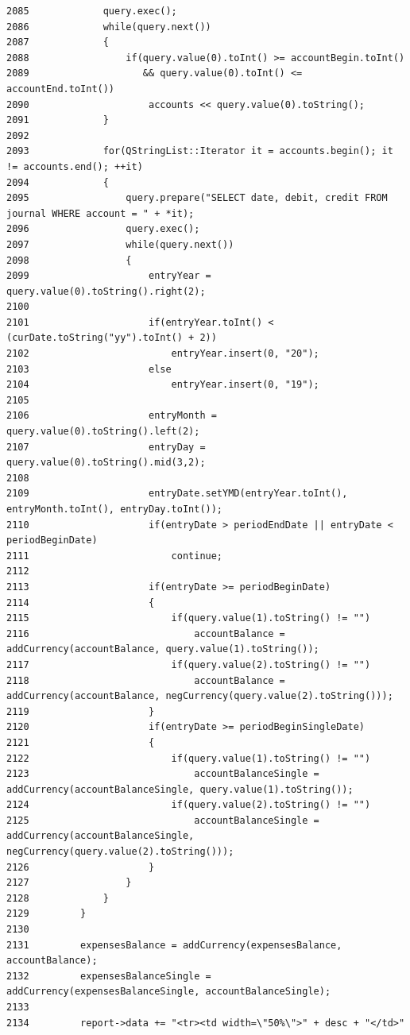 \begin{verbatim}
2085             query.exec();
2086             while(query.next())
2087             {
2088                 if(query.value(0).toInt() >= accountBegin.toInt()
2089                    && query.value(0).toInt() <= accountEnd.toInt())
2090                     accounts << query.value(0).toString();
2091             }
2092 
2093             for(QStringList::Iterator it = accounts.begin(); it != accounts.end(); ++it)
2094             {
2095                 query.prepare("SELECT date, debit, credit FROM journal WHERE account = " + *it);
2096                 query.exec();
2097                 while(query.next())
2098                 {
2099                     entryYear = query.value(0).toString().right(2);
2100 
2101                     if(entryYear.toInt() < (curDate.toString("yy").toInt() + 2))
2102                         entryYear.insert(0, "20");
2103                     else
2104                         entryYear.insert(0, "19");
2105 
2106                     entryMonth = query.value(0).toString().left(2);
2107                     entryDay = query.value(0).toString().mid(3,2);
2108 
2109                     entryDate.setYMD(entryYear.toInt(), entryMonth.toInt(), entryDay.toInt());
2110                     if(entryDate > periodEndDate || entryDate < periodBeginDate)
2111                         continue;
2112 
2113                     if(entryDate >= periodBeginDate)
2114                     {
2115                         if(query.value(1).toString() != "")
2116                             accountBalance = addCurrency(accountBalance, query.value(1).toString());
2117                         if(query.value(2).toString() != "")
2118                             accountBalance = addCurrency(accountBalance, negCurrency(query.value(2).toString()));
2119                     }
2120                     if(entryDate >= periodBeginSingleDate)
2121                     {
2122                         if(query.value(1).toString() != "")
2123                             accountBalanceSingle = addCurrency(accountBalanceSingle, query.value(1).toString());
2124                         if(query.value(2).toString() != "")
2125                             accountBalanceSingle = addCurrency(accountBalanceSingle, negCurrency(query.value(2).toString()));
2126                     }
2127                 }
2128             }
2129         }
2130 
2131         expensesBalance = addCurrency(expensesBalance, accountBalance);
2132         expensesBalanceSingle = addCurrency(expensesBalanceSingle, accountBalanceSingle);
2133 
2134         report->data += "<tr><td width=\"50%\">" + desc + "</td>"

\end{verbatim}
